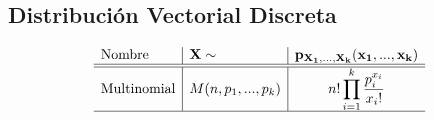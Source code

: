 \documentclass[a4paper,spanish]{article}
\begin{document}
\subsection{Distribuci\'on Vectorial Discreta}
$$
\begin{array}{l|l|c}
\mathbf{\mbox{Nombre}} & \mathbf{X \sim} & 
	\mathbf{p_{X_1,...,X_k}(x_1,...,x_k)} \\\hline\hline
\mbox{Multinomial} & M(n,p_1,...,p_k) & 
	\displaystyle n! \prod_{i=1}^k \frac{p_i^{x_i}}{x_i!} \\\hline
\end{array}
$$


\label{theend}
\end{document}
